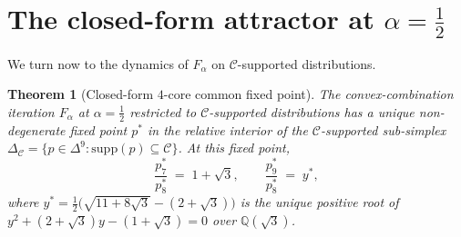 \documentclass[11pt,reqno]{amsart}
\theoremstyle{plain}
\newtheorem{theorem}{Theorem}
\theoremstyle{definition}
\theoremstyle{remark}
\newcommand{\Q}{\mathbb{Q}}
\newcommand{\Cfour}{\mathcal{C}}
\newcommand{\Fmix}{F_{\alpha}}
\newcommand{\Simp}{\Delta^{9}}
\begin{document}
\section{The closed-form attractor at $\alpha=\tfrac12$}\label{sec:attractor}

We turn now to the dynamics of $\Fmix$ on $\Cfour$-supported
distributions.

\begin{theorem}[Closed-form $4$-core common fixed point]\label{thm:attractor}
The convex-combination iteration $\Fmix$ at $\alpha=\tfrac12$
restricted to $\Cfour$-supported distributions has a unique
non-degenerate fixed point $p^{*}$ in the relative interior of
the $\Cfour$-supported sub-simplex
$\Delta_{\Cfour}=\{p\in\Simp:\mathrm{supp}(p)\subseteq\Cfour\}$.
At this fixed point,
\[
\frac{p^{*}_{7}}{p^{*}_{8}}\;=\;1+\sqrt{3},\qquad
\frac{p^{*}_{9}}{p^{*}_{8}}\;=\;y^{*},
\]
where $y^{*}=\tfrac{1}{2}\bigl(\sqrt{11+8\sqrt{3}}-(2+\sqrt{3})\bigr)$
is the unique positive root of $y^{2}+(2+\sqrt{3})y-(1+\sqrt{3})=0$
over $\Q(\sqrt{3})$.
\end{theorem}
\end{document}
